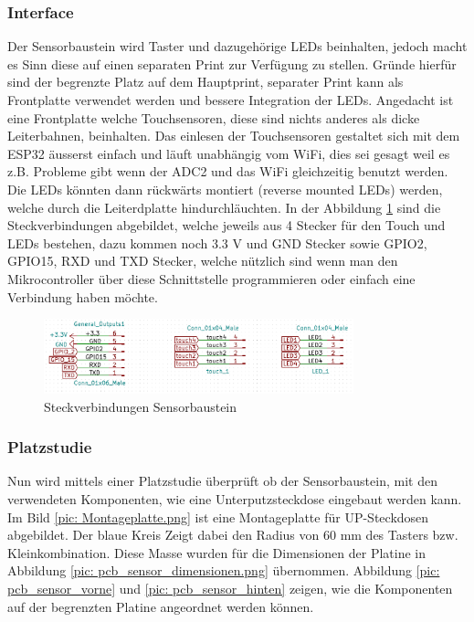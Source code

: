 \subsubsection{Interface}
Der Sensorbaustein wird Taster und dazugehörige LEDs beinhalten, jedoch macht es Sinn diese auf einen separaten Print zur Verfügung zu stellen. Gründe hierfür sind der begrenzte Platz auf dem Hauptprint, separater Print kann als Frontplatte verwendet werden und bessere Integration der LEDs. Angedacht ist eine Frontplatte welche Touchsensoren, diese sind nichts anderes als dicke Leiterbahnen, beinhalten. Das einlesen der Touchsensoren gestaltet sich mit dem ESP32 äusserst einfach und läuft unabhängig vom WiFi, dies sei gesagt weil es z.B. Probleme gibt wenn der ADC2 und das WiFi gleichzeitig benutzt werden. Die LEDs könnten dann rückwärts montiert (reverse mounted LEDs) werden, welche durch die Leiterdplatte hindurchläuchten. In der Abbildung \ref{pic: Stecker_Sensor} sind die Steckverbindungen abgebildet, welche jeweils aus 4 Stecker für den Touch und LEDs bestehen, dazu kommen noch 3.3 V und GND Stecker sowie GPIO2, GPIO15, RXD und TXD Stecker, welche nützlich sind wenn man den Mikrocontroller über diese Schnittstelle programmieren oder einfach eine Verbindung haben möchte.
\begin{figure}[h!]
	\centering
	\includegraphics[width=0.8\textwidth]{graphics/shematics_sensor_stecker.png}
	\caption{Steckverbindungen Sensorbaustein}
	\label{pic: Stecker_Sensor}
\end{figure}
\subsubsection{Platzstudie}
Nun wird mittels einer Platzstudie überprüft ob der Sensorbaustein, mit den verwendeten Komponenten, wie eine Unterputzsteckdose eingebaut werden kann.
Im Bild \ref{pic: Montageplatte.png} ist eine Montageplatte für UP-Steckdosen abgebildet. Der blaue Kreis Zeigt dabei den Radius von 60 mm des Tasters bzw. Kleinkombination. Diese Masse wurden für die Dimensionen der Platine in Abbildung \ref{pic: pcb_sensor_dimensionen.png} übernommen. Abbildung \ref{pic: pcb_sensor_vorne} und \ref{pic: pcb_sensor_hinten} zeigen, wie die Komponenten auf der begrenzten Platine angeordnet werden können.

